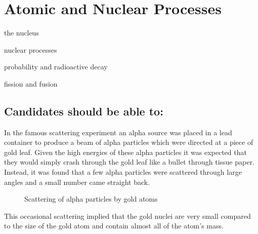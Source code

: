 \documentclass[revision-guide.tex]{subfiles}
\begin{document}
\chapter{Atomic and Nuclear Processes}
\begin{content}
  \item the nucleus
  \item nuclear processes
  \item probability and radioactive decay
  \item fission and fusion
\end{content}
\section*{Candidates should be able to:}

In the famous scattering experiment an alpha source was placed in a lead container to produce a beam of alpha particles which were directed at a piece of gold leaf. Given the high energies of these alpha particles it was expected that they would simply crash through the gold leaf like a bullet through tissue paper. Instead, it was found that a few alpha particles were scattered through large angles and a small number came straight back.
\newpage
\begin{figure}[h]
  \begin{center}
  \end{center}
  \caption{Scattering of alpha particles by gold atoms}
  \label{fig:scattering}
\end{figure}

This occasional scattering implied that the gold nuclei are very small compared to the size of the gold atom and contain almost all of the atom's mass.
\end{document}
